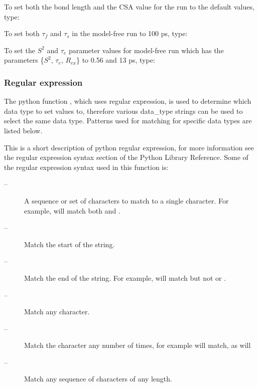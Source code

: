  To set both the bond length and the CSA value for the run  to the default values, type: 
  


 To set both $\tau_f$ and $\tau_s$ in the model-free run  to 100 ps, type: 
  



 To set the $S^2$ and $\tau_e$ parameter values for model-free run  which has the parameters \{$S^2$, $\tau_e$, $R_{ex}$\} to 0.56 and 13 ps, type: 
  




  
 \subsubsection{Regular expression} 

 The python function , which uses regular expression, is used to determine which data type to set values to, therefore various data\_type strings can be used to select the same data type.  Patterns used for matching for specific data types are listed below. 
  

 This is a short description of python regular expression, for more information see the regular expression syntax section of the Python Library Reference.  Some of the regular expression syntax used in this function is: 
  

 \begin{description} 
 \item[\quotecmd{[]} --]  A sequence or set of characters to match to a single character.  For example,  will match both  and .  
 \item[\quotecmd{\^{}} --]  Match the start of the string.  
 \item[\quotecmd{\$} --]  Match the end of the string.  For example,  will match  but not  or .  
 \item[ --]  Match any character.  
 \item[ --]  Match the character  any number of times, for example  will match, as will   
 \item[ --]  Match any sequence of characters of any length.  
 \end{description} 
  

